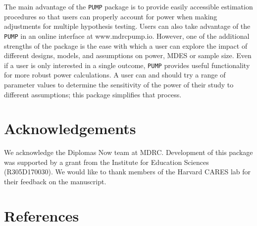 \documentclass[
]{article}
\begin{document}
The main advantage of the \texttt{PUMP} package is to provide easily
accessible estimation procedures so that users can properly account for
power when making adjustments for multiple hypothesis testing. Users can
also take advantage of the \texttt{PUMP} in an online interface at
www.mdrcpump.io. However, one of the additional strengths of the package
is the ease with which a user can explore the impact of different
designs, models, and assumptions on power, MDES or sample size. Even if
a user is only interested in a single outcome, \texttt{PUMP} provides
useful functionality for more robust power calculations. A user can and
should try a range of parameter values to determine the sensitivity of
the power of their study to different assumptions; this package
simplifies that process.

\section*{Acknowledgements}

We acknowledge the Diplomas Now team at MDRC. Development of this
package was supported by a grant from the Institute for Education
Sciences (R305D170030). We would like to thank members of the Harvard
CARES lab for their feedback on the manuscript.

\section{References}
\end{document}
